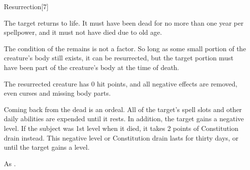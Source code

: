 \begin{spellsection}{Resurrection}[7]
    \begin{spellheader}
    \end{spellheader}
    \begin{spellcontent}
        \begin{spelltargetinginfo}
        \end{spelltargetinginfo}
        \begin{spelleffects}

            \spelleffect The target returns to life. It must have been dead for no more than one year per spellpower, and it must not have died due to old age.

            The condition of the remains is not a factor. So long as some small portion of the creature's body still exists, it can be resurrected, but the target portion must have been part of the creature's body at the time of death.

            The resurrected creature has 0 hit points, and all negative effects are removed, even curses and missing body parts.

            \par Coming back from the dead is an ordeal. All of the target's spell slots and other daily abilities are expended until it rests. In addition, the target gains a negative level. If the subject was 1st level when it died, it takes 2 points of Constitution drain instead. This negative level or Constitution drain lasts for thirty days, or until the target gains a level.
        \end{spelleffects}
    \end{spellcontent}
    \begin{spellfooter}
        \spellnotes As .
    \end{spellfooter}
\end{spellsection}

